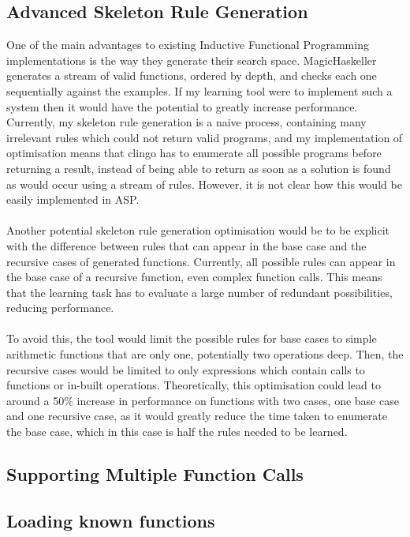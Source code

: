 \subsection{Advanced Skeleton Rule Generation}
One of the main advantages to existing Inductive Functional Programming implementations is the way they generate their search space. MagicHaskeller generates a stream of valid functions, ordered by depth, and checks each one sequentially against the examples. If my learning tool were to implement such a system then it would have the potential to greatly increase performance. Currently, my skeleton rule generation is a naive process, containing many irrelevant rules which could not return valid programs, and my implementation of optimisation means that clingo has to enumerate all possible programs before returning a result, instead of being able to return as soon as a solution is found as would occur using a stream of rules. However, it is not clear how this would be easily implemented in ASP. \\ \\
Another potential skeleton rule generation optimisation would be to be explicit with the difference between rules that can appear in the base case and the recursive cases of generated functions. Currently, all possible rules can appear in the base case of a recursive function, even complex function calls. This means that the learning task has to evaluate a large number of redundant possibilities, reducing performance. \\ \\
To avoid this, the tool would limit the possible rules for base cases to simple arithmetic functions that are only one, potentially two operations deep. Then, the recursive cases would be limited to only expressions which contain calls to functions or in-built operations. Theoretically, this optimisation could lead to around a 50\% increase in performance on functions with two cases, one base case and one recursive case, as it would greatly reduce the time taken to enumerate the base case, which in this case is half the rules needed to be learned.

\subsection{Supporting Multiple Function Calls}

\subsection{Loading known functions}

